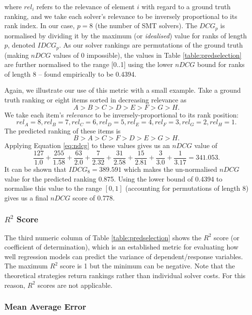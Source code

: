 where $rel_i$ refers to the relevance of element $i$ with regard to a ground truth ranking, and we take each solver's relevance to be inversely proportional to its rank index.  
In our case, $p = 8$ (the number of SMT solvers).  
The $DCG_p$ is normalised by dividing it by the maximum (or \textit{idealised}) value for ranks of length $p$, denoted $IDCG_p$. 
As our solver rankings are permutations of the ground truth (making $nDCG$ values of 0 impossible), the values in Table \ref{table:predselection} are further normalised to the range [0..1] using the lower $nDCG$ bound for ranks of length 8 -- found empirically to be 0.4394.

Again, we illustrate our use of this metric with a small example. 
Take a ground truth ranking or eight items sorted in decreasing relevance as
\[ A > B > C > D > E > F > G > H. \]
We take each item's \textit{relevance} to be inversely-proportional to its rank position:
\[rel_A=8, rel_B=7, rel_C=6, rel_D=5, rel_E=4, rel_F=3, rel_G=2, rel_H=1.\]
The predicted ranking of these items is
\[ B > A > C > F > D > E > G > H .\]
Applying Equation \ref{eq:ndcg} to these values gives us an $nDCG$ value of
\[
\frac{127}{1.0} + \frac{255}{1.58} + \frac{63}{2.0} + \frac{7}{2.32} + \frac{31}{2.58} + \frac{15}{2.81} + \frac{3}{3.0} + \frac{1}{3.17} = 341.053. 
\]
It can be shown that $IDCG_8 = 389.591$ which makes the un-normalised $nDCG$ value for the predicted ranking 0.875. Using the lower bound of 0.4394 to normalise this value to the range $\left[0, 1 \right]$ (accounting for permutations of length 8) gives us a final $nDCG$ score of 0.778. 

\subsubsection{$R^2$ Score}

The third numeric column of Table \ref{table:predselection} shows
the $R^2$ score (or coefficient of determination), which is an established metric for evaluating how well regression models can predict the variance of dependent/response variables. 
The maximum $R^2$ score is 1 but the minimum can be negative. Note that the theoretical strategies return rankings rather than individual solver costs. 
For this reason, $R^2$ scores are not applicable.

\subsubsection{Mean Average Error}

